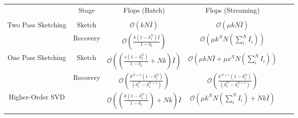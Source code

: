 \begin{table}[h]
\centering
\label{tbl: time-complexity}
\begin{tabular}{cccccl}
\multicolumn{1}{c|}{}                                    & \multicolumn{1}{c|}{Stage}    & \multicolumn{1}{c|}{Flops (Batch)}                                                   & Flops (Streaming)                                                 &                      &  \\ \cline{1-4}
\multicolumn{1}{l|}{}                                    & \multicolumn{1}{l|}{}         & \multicolumn{1}{l|}{}                                                                          & \multicolumn{1}{l}{}                                                      & \multicolumn{1}{l}{} &  \\
\multicolumn{1}{c|}{Two Pass Sketching}                  & \multicolumn{1}{c|}{Sketch}   & \multicolumn{1}{c|}{$\mathcal{O}(kN\bar{I})$}                                                  & $\mathcal{O}(\mu kN\bar{I})$                                           &                      &  \\
\multicolumn{1}{c|}{}                                    & \multicolumn{1}{c|}{Recovery} & \multicolumn{1}{c|}{$\mathcal{O}(\frac{k(1-\delta_1^N)\bar{I}}{1-\delta_1})$}                  & $\mathcal{O}(\mu k^N N(\sum_{i}^NI_i))$                                             &                      &  \\
\multicolumn{1}{c|}{\multirow{2}{*}{One Pass Sketching}} & \multicolumn{1}{c|}{Sketch}   & \multicolumn{1}{c|}{$\mathcal{O}((\frac{s(1-\delta_2^N)}{1-\delta_2}+Nk)\bar{I})$}             & $\mathcal{O}(\mu kN\bar{I}+ \mu s^NN(\sum_{i}^NI_i))$               &                      &  \\
\multicolumn{1}{c|}{}                                    & \multicolumn{1}{c|}{Recovery} & \multicolumn{1}{c|}{$\mathcal{O}(\frac{k^{N+1}(1-\delta_1^N)}{(\delta_1^N- \delta_1^{N+1})})$} & $\mathcal{O}(\frac{k^{N+1}(1-\delta_1^N)}{(\delta_1^N- \delta_1^{N+1})})$ &                      &  \\
\multicolumn{1}{c|}{Higher-Order SVD}                    & \multicolumn{1}{c|}{}         & \multicolumn{1}{c|}{$\mathcal{O}((\frac{k(1-\delta_1^N)}{1-\delta_1})+Nk)\bar{I}$}                  & $\mathcal{O}(\mu k^N N(\sum_{i}^NI_i)+Nk\bar{I})$                                             &                      &  \\
                                                         &                               &                                                                                                &                                                                           &                      & 

\end{tabular}
\end{table}
